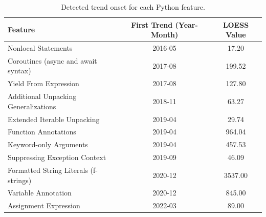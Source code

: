 \begin{table}[htb]
\centering
\caption{Detected trend onset for each Python feature.}
\label{tab:trend_onsets}
\begin{tabular}{lcc}
\toprule
Feature & First Trend (Year-Month) & LOESS Value \\
\midrule
Nonlocal Statements & 2016-05 & 17.20 \\
Coroutines (async and await syntax) & 2017-08 & 199.52 \\
Yield From Expression & 2017-08 & 127.80 \\
Additional Unpacking Generalizations & 2018-11 & 63.27 \\
Extended Iterable Unpacking & 2019-04 & 29.74 \\
Function Annotations & 2019-04 & 964.04 \\
Keyword-only Arguments & 2019-04 & 457.53 \\
Suppressing Exception Context & 2019-09 & 46.09 \\
Formatted String Literals (f-strings) & 2020-12 & 3537.00 \\
Variable Annotation & 2020-12 & 845.00 \\
Assignment Expression & 2022-03 & 89.00 \\
\bottomrule
\end{tabular}
\end{table}
